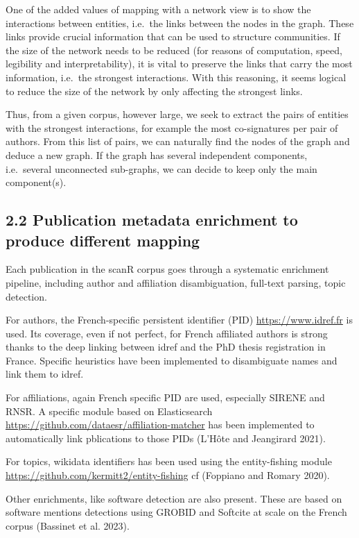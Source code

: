 \documentclass[
]{article}
\begin{document}
One of the added values of mapping with a network view is to show the
interactions between entities, i.e.~the links between the nodes in the
graph. These links provide crucial information that can be used to
structure communities. If the size of the network needs to be reduced
(for reasons of computation, speed, legibility and interpretability), it
is vital to preserve the links that carry the most information, i.e.~the
strongest interactions. With this reasoning, it seems logical to reduce
the size of the network by only affecting the strongest links.

Thus, from a given corpus, however large, we seek to extract the pairs
of entities with the strongest interactions, for example the most
co-signatures per pair of authors. From this list of pairs, we can
naturally find the nodes of the graph and deduce a new graph. If the
graph has several independent components, i.e.~several unconnected
sub-graphs, we can decide to keep only the main component(s).

\hypertarget{publication-metadata-enrichment-to-produce-different-mapping}{%
\subsection{2.2 Publication metadata enrichment to produce different
mapping}\label{publication-metadata-enrichment-to-produce-different-mapping}}

Each publication in the scanR corpus goes through a systematic
enrichment pipeline, including author and affiliation disambiguation,
full-text parsing, topic detection.

For authors, the French-specific persistent identifier (PID)
\url{https://www.idref.fr} is used. Its coverage, even if not perfect,
for French affiliated authors is strong thanks to the deep linking
between idref and the PhD thesis registration in France. Specific
heuristics have been implemented to disambiguate names and link them to
idref.

For affiliations, again French specific PID are used, especially SIRENE
and RNSR. A specific module based on Elasticsearch
\url{https://github.com/dataesr/affiliation-matcher} has been
implemented to automatically link pblications to those PIDs (L'Hôte and
Jeangirard 2021).

For topics, wikidata identifiers has been used using the entity-fishing
module \url{https://github.com/kermitt2/entity-fishing} cf (Foppiano and
Romary 2020).

Other enrichments, like software detection are also present. These are
based on software mentions detections using GROBID and Softcite at scale
on the French corpus (Bassinet et al. 2023).
\end{document}
